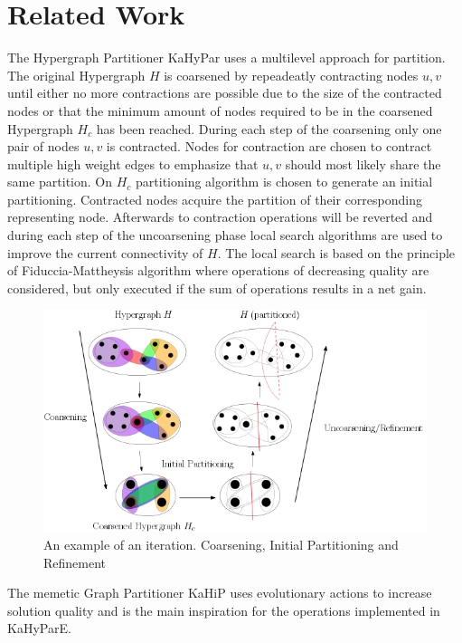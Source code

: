 \documentclass[a4paper,12pt,bibtotoc,titlepage, liststotoc,BCOR7mm,headsepline,pointlessnumbers]{scrbook}
\numberwithin{equation}{section}
\begin{document}
\chapter{Related Work}
The Hypergraph Partitioner KaHyPar uses a multilevel approach for partition. The original Hypergraph $H$ is coarsened by repeadeatly contracting nodes $u,v$ until either no more contractions are possible due to the size of the contracted nodes or that the minimum amount of nodes required to be in the coarsened Hypergraph $H_c$ has been reached. During each step of the coarsening only one pair of nodes $u, v$ is contracted. Nodes for contraction are chosen to contract multiple high weight edges to emphasize that $u,v$ should most likely share the same partition. 
On $H_c$ partitioning algorithm is chosen to generate an initial partitioning. Contracted nodes acquire the partition of their corresponding representing node.  Afterwards to contraction operations will be reverted and 
during each step of the uncoarsening phase local search algorithms are used to improve the current connectivity of $H$. The local search is based on the principle of
Fiduccia-Mattheysis algorithm where operations of decreasing quality are considered, but only executed if the sum of operations results in a net gain.
\newline
\begin{figure}[t!] 
    \vspace*{-.25cm}
  \centering
   \includegraphics[width=.8\textwidth]{Ipe/iteration.png}
  \caption{An example of an iteration. Coarsening, Initial Partitioning and Refinement}\label{fig:img.png} %
    \vspace*{-.5cm}
\end{figure}

The memetic Graph Partitioner KaHiP uses evolutionary actions to increase solution quality and is the main inspiration for the operations implemented in KaHyParE.
\end{document}
